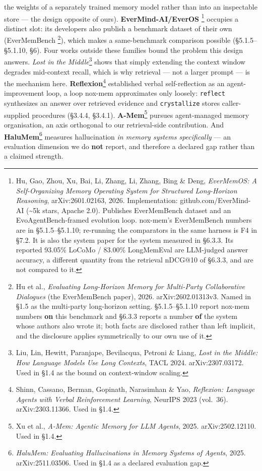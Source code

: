 \documentclass[
]{article}
\begin{document}
the weights of a separately trained memory model rather than into an
inspectable store --- the design opposite of ours).
\textbf{EverMind-AI/EverOS} \footnote{Hu, Gao, Zhou, Xu, Bai, Li, Zhang,
  Li, Zhang, Bing \& Deng, \emph{EverMemOS: A Self-Organizing Memory
  Operating System for Structured Long-Horizon Reasoning},
  arXiv:2601.02163, 2026. Implementation: github.com/EverMind-AI
  (\textasciitilde5k stars, Apache 2.0). Publishes EverMemBench dataset
  and an EvoAgentBench-framed evolution loop. nox-mem's EverMemBench
  numbers are in §5.1.5--§5.1.10; re-running the comparators in the same
  harness is F4 in §7.2. It is also the system paper for the system
  measured in §6.3.3. Its reported 93.05\% LoCoMo / 83.00\% LongMemEval
  are LLM-judged answer accuracy, a different quantity from the
  retrieval nDCG@10 of §6.3.3, and are not compared to it.} occupies a
distinct slot: its developers also publish a benchmark dataset of their
own (EverMemBench \footnote{Hu et al., \emph{Evaluating Long-Horizon
  Memory for Multi-Party Collaborative Dialogues} (the EverMemBench
  paper), 2026. arXiv:2602.01313v3. Named in §1.5 as the multi-party
  long-horizon setting. §5.1.5--§5.1.10 report nox-mem numbers
  \textbf{on} this benchmark and §6.3.3 reports a number \textbf{of} the
  system whose authors also wrote it; both facts are disclosed rather
  than left implicit, and the disclosure applies symmetrically to our
  own use of it.}), which makes a same-benchmark comparison possible
(§5.1.5--§5.1.10, §6). Four works outside these families bound the
problem this design answers. \emph{Lost in the Middle}\footnote{Liu,
  Lin, Hewitt, Paranjape, Bevilacqua, Petroni \& Liang, \emph{Lost in
  the Middle: How Language Models Use Long Contexts}, TACL 2024.
  arXiv:2307.03172. Used in §1.4 as the bound on context-window scaling.}
shows that simply extending the context window degrades mid-context
recall, which is why retrieval --- not a larger prompt --- is the
mechanism here. \textbf{Reflexion}\footnote{Shinn, Cassano, Berman,
  Gopinath, Narasimhan \& Yao, \emph{Reflexion: Language Agents with
  Verbal Reinforcement Learning}, NeurIPS 2023 (vol.~36).
  arXiv:2303.11366. Used in §1.4.} established verbal self-reflection as
an agent-improvement loop, a loop nox-mem approximates only loosely:
\texttt{reflect} synthesizes an answer over retrieved evidence and
\texttt{crystallize} stores caller-supplied procedures (§3.4.4, §3.4.1).
\textbf{A-Mem}\footnote{Xu et al., \emph{A-Mem: Agentic Memory for LLM
  Agents}, 2025. arXiv:2502.12110. Used in §1.4.} pursues agent-managed
memory organisation, an axis orthogonal to our retrieval-side
contribution. And \textbf{HaluMem}\footnote{\emph{HaluMem: Evaluating
  Hallucinations in Memory Systems of Agents}, 2025. arXiv:2511.03506.
  Used in §1.4 as a declared evaluation gap.} measures hallucination
\emph{in memory systems specifically} --- an evaluation dimension we do
\textbf{not} report, and therefore a declared gap rather than a claimed
strength.
\end{document}
